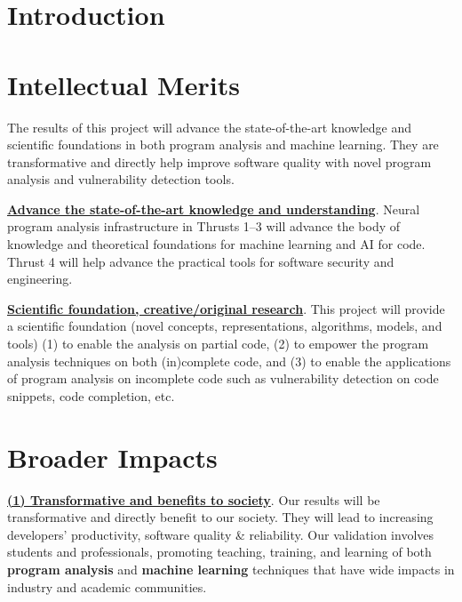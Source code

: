 \section{Introduction}



%





\section{Intellectual Merits}

The results of this project will advance the state-of-the-art
knowledge and scientific foundations in both program analysis and
machine learning. They are transformative and directly help improve
software quality with novel program analysis and vulnerability
detection tools.

\noindent \underline{{\bf Advance the state-of-the-art knowledge and
    understanding}}. Neural program analysis infrastructure in Thrusts
1--3 will advance the body of knowledge and theoretical foundations
for machine learning and AI for code. Thrust 4 will help advance the
practical tools for software security and engineering.

\noindent \underline{{\bf Scientific foundation, creative/original
    research}}. This project will provide a scientific
foundation (novel concepts, representations, algorithms, models,
and tools) (1) to enable the analysis on partial code, (2) to empower
the program analysis techniques on both (in)complete code,
and (3) to enable the applications of program analysis on incomplete
code such as vulnerability detection on code snippets, code
completion, etc.

\section{Broader Impacts}

\underline{{\bf (1) Transformative and benefits to society}}. Our
results will be transformative and directly benefit to our society.
They will lead to increasing developers' productivity, software
quality \& reliability.  Our validation involves students and
professionals, promoting teaching, training, and learning of both {\bf
  program analysis} and {\bf machine learning} techniques that
have wide impacts in industry and academic communities.

